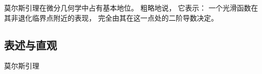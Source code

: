 
\begin{issues}
\issueTODO
\issueDraft
\end{issues}


莫尔斯引理在微分几何学中占有基本地位。 粗略地说， 它表示： 一个光滑函数在其非退化临界点附近的表现， 完全由其在这一点处的二阶导数决定。

\subsection{表述与直观}
\begin{lemma}{莫尔斯引理}

\end{lemma}
